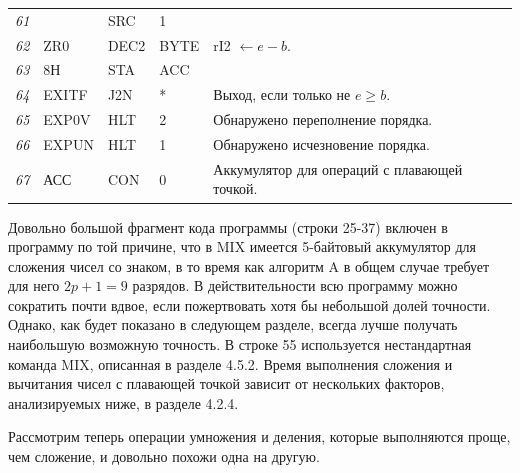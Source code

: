 \begin{longtable}{l l l l l}
\textit{61} & & SRC & 1 &\\	
\textit{62}	& ZR0 & DEC2 & BYTE & rI2 $\leftarrow e - b$.\\
\textit{63} & 8Н & STA & ACC &\\
\textit{64} & EXITF & J2N & * & Выход, если только не $e \geq b$.\\
\textit{65} & EXP0V & HLT & 2 & Обнаружено переполнение порядка.\\
\textit{66}	& EXPUN & HLT & 1 & Обнаружено исчезновение порядка.\\
\textit{67}	& АСС & CON	& 0 & Аккумулятор для операций с плавающей точкой.\\

\end{longtable}

Довольно большой фрагмент кода программы (строки 25-37) включен в программу по той причине, что в MIX имеется 5-байтовый аккумулятор для сложения чисел со знаком, в то время как алгоритм A в общем случае требует для него $2p + 1 = 9$ разрядов. В действительности всю программу можно сократить почти вдвое, если пожертвовать хотя бы небольшой долей точности. Однако, как будет показано в следующем разделе, всегда лучше получать наибольшую возможную точность. В строке 55 используется нестандартная команда MIX, описанная в разделе 4.5.2. Время выполнения сложения и вычитания чисел с плавающей точкой зависит от нескольких факторов, анализируемых ниже, в разделе 4.2.4.

Рассмотрим теперь операции умножения и деления, которые выполняются проще, чем сложение, и довольно похожи одна на другую.

